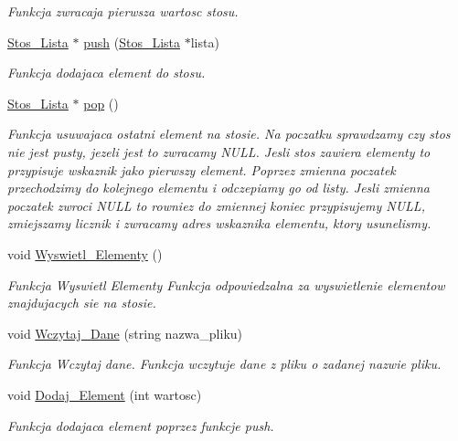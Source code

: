 \begin{DoxyCompactItemize}
\begin{DoxyCompactList}\small\item\em \-Funkcja zwracaja pierwsza wartosc stosu. \end{DoxyCompactList}\item 
\hyperlink{struct_stos___lista}{\-Stos\-\_\-\-Lista} $\ast$ \hyperlink{class_lista_a55a56d6c497fb86b24e52108e10cecb7}{push} (\hyperlink{struct_stos___lista}{\-Stos\-\_\-\-Lista} $\ast$lista)
\begin{DoxyCompactList}\small\item\em \-Funkcja dodajaca element do stosu. \end{DoxyCompactList}\item 
\hyperlink{struct_stos___lista}{\-Stos\-\_\-\-Lista} $\ast$ \hyperlink{class_lista_a7d20049e42451f08fe6183c5b9593e64}{pop} ()
\begin{DoxyCompactList}\small\item\em \-Funkcja usuwajaca ostatni element na stosie. \-Na poczatku sprawdzamy czy stos nie jest pusty, jezeli jest to zwracamy \-N\-U\-L\-L. \-Jesli stos zawiera elementy to przypisuje wskaznik jako pierwszy element. \-Poprzez zmienna poczatek przechodzimy do kolejnego elementu i odczepiamy go od listy. \-Jesli zmienna poczatek zwroci \-N\-U\-L\-L to rowniez do zmiennej koniec przypisujemy \-N\-U\-L\-L, zmiejszamy licznik i zwracamy adres wskaznika elementu, ktory usunelismy. \end{DoxyCompactList}\item 
void \hyperlink{class_lista_a7c339180af427e4a74c527faa78ba9a9}{\-Wyswietl\-\_\-\-Elementy} ()
\begin{DoxyCompactList}\small\item\em \-Funkcja \-Wyswietl \-Elementy \-Funkcja odpowiedzalna za wyswietlenie elementow znajdujacych sie na stosie. \end{DoxyCompactList}\item 
void \hyperlink{class_lista_a2e4a779feb5c52de96242bdea8bb5624}{\-Wczytaj\-\_\-\-Dane} (string nazwa\-\_\-pliku)
\begin{DoxyCompactList}\small\item\em \-Funkcja \-Wczytaj dane. \-Funkcja wczytuje dane z pliku o zadanej nazwie pliku. \end{DoxyCompactList}\item 
void \hyperlink{class_lista_a3971ffa506a1fbd947acaa12458a289f}{\-Dodaj\-\_\-\-Element} (int wartosc)
\begin{DoxyCompactList}\small\item\em \-Funkcja dodajaca element poprzez funkcje push. \end{DoxyCompactList}\item 

\end{DoxyCompactItemize}
